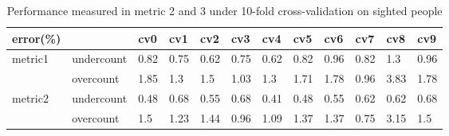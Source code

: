 \documentclass[11pt]{article}
\begin{document}
\begin{table}[]
\centering
\caption{Performance measured in metric 2 and 3 under 10-fold cross-validation on sighted people}
\label{label_metric23_sighted}
\begin{tabular}{llllllllllll}
\hline
error(\%)                &            & cv0   & cv1   & cv2   & cv3   & cv4   & cv5   & cv6   & cv7   & cv8   & cv9  \\ \hline
metric1                  & undercount & 0.82  & 0.75  & 0.62  & 0.75  & 0.62  & 0.82  & 0.96  & 0.82  & 1.3   & 0.96 \\
                         & overcount  & 1.85  & 1.3   & 1.5   & 1.03  & 1.3   & 1.71  & 1.78  & 0.96  & 3.83  & 1.78 \\ \hline
\multirow{2}{*}{metric2} & undercount & 0.48  & 0.68  & 0.55  & 0.68  & 0.41  & 0.48  & 0.55  & 0.62  & 0.62  & 0.68 \\
                         & overcount  & 1.5   & 1.23  & 1.44  & 0.96  & 1.09  & 1.37  & 1.37  & 0.75  & 3.15  & 1.5  \\ \hline
\end{tabular}
\end{table}
\end{document}
